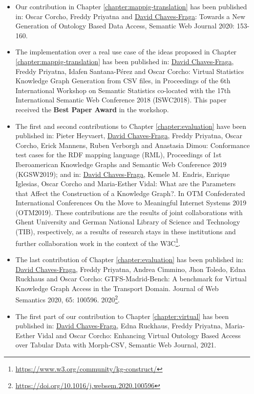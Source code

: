 \begin{itemize}
    \item Our contribution in Chapter \ref{chapter:mappig-translation} has been published in: Oscar Corcho, Freddy Priyatna and \underline{David Chaves-Fraga}: Towards a New Generation of Ontology Based Data Access, Semantic Web Journal 2020: 153-160.
    \item The implementation over a real use case of the ideas proposed in Chapter \ref{chapter:mappig-translation} has been published in: \underline{David Chaves-Fraga}, Freddy Priyatna, Idafen Santana-Pérez and Oscar Corcho: Virtual Statistics Knowledge Graph Generation from CSV files, in Proceedings of the 6th International Workshop on Semantic Statistics co-located with the 17th International Semantic Web Conference 2018 (ISWC2018). This paper received the \textbf{Best Paper Award} in the workshop.
    \item The first and second contributions to Chapter \ref{chapter:evaluation} have been published in: Pieter Heyvaert, \underline{David Chaves-Fraga}, Freddy Priyatna, Oscar Corcho, Erick Mannens, Ruben Verborgh and Anastasia Dimou: Conformance test cases for the RDF mapping language (RML), Proceedings of 1st Iberoamerican Knowledge Graphs and Semantic Web Conference 2019 (KGSW2019); and in: \underline{David Chaves-Fraga}, Kemele M. Endris, Enrique Iglesias, Oscar Corcho and Maria-Esther Vidal: What are the Parameters that Affect the Construction of a Knowledge Graph?. In OTM Confederated International Conferences On the Move to Meaningful Internet Systems 2019 (OTM2019). These contributions are the results of joint collaborations with Ghent University and German National Library of Science and Technology (TIB), respectively, as a results of research stays in these institutions and further collaboration work in the context of the W3C\footnote{\url{https://www.w3.org/community/kg-construct/}}.
    \item The last contribution of Chapter \ref{chapter:evaluation} has been published in: \underline{David Chaves-Fraga}, Freddy Priyatna, Andrea Cimmino, Jhon Toledo, Edna Ruckhaus and Oscar Corcho: GTFS-Madrid-Bench: A benchmark for Virtual Knowledge Graph Access in the Transport Domain. Journal of Web Semantics 2020, 65: 100596. 2020\footnote{\url{https://doi.org/10.1016/j.websem.2020.100596}}.
    \item The first part of our contribution to Chapter \ref{chapter:virtual} has been published in: \underline{David Chaves-Fraga}, Edna Ruckhaus, Freddy Priyatna, Maria-Esther Vidal and Oscar Corcho: Enhancing Virtual Ontology Based Access over Tabular Data with Morph-CSV, Semantic Web Journal, 2021.

\end{itemize}
